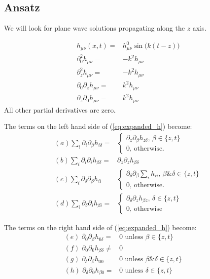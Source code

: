 \documentclass[]{article}
\begin{document}
\subsection{Ansatz}

We will look for plane wave solutions propagating along the $z$ axis.

\begin{align*}
	h_{\mu\nu}(x,t)=&h^0_{\mu\nu} \sin\big(k(t-z)\big)\\
	\partial_0^2 h_{\mu\nu}=& -k^2 h_{\mu\nu}\\
	\partial_z^2 h_{\mu\nu}=& -k^2 h_{\mu\nu}\\
	\partial_0 \partial_z  h_{\mu\nu}=& k^2 h_{\mu\nu}\\
	\partial_z \partial_0  h_{\mu\nu}=& k^2 h_{\mu\nu}
\end{align*}
All other partial derivatives are zero.

The terms on the left hand side of (\ref{eq:expanded_h}) become:
\begin{align*}
	(a)	\sum_i \partial_i\partial_\beta h_{i\delta} =& \begin{cases}
			\partial_z\partial_\beta h_{z\delta} \text{, $\beta\in \{z,t\}$}\\
			0 \text{, otherwise.}
		\end{cases}\\
	(b)	\sum_i \partial_i\partial_i h_{\beta\delta} =& \partial_z\partial_z h_{\beta\delta}\\
	(c)	\sum_i \partial_\delta \partial_\beta h_{ii} =&\begin{cases}
	\partial_\delta \partial_\beta \sum_i h_{ii} \text{, $\beta\&\delta\in\{z,t\}$}\\
	0 \text{, otherwise}.
	\end{cases}\\
	(d)	\sum_i \partial_\delta\partial_i h_{\beta i} =& \begin{cases}
	\partial_\delta\partial_z h_{\beta z} \text {, $\delta\in\{z,t\}$}\\
	0 \text{, otherwise }
	\end{cases}
\end{align*}

The terms on the right hand side of (\ref{eq:expanded_h}) become:
\begin{align*}
	(e)\;	\partial_0\partial_\beta h_{0\delta}=&0 \text{ unless $\beta\in\{z,t\}$ }\\
	(f)\;	\partial_0\partial_0 h_{\beta\delta}\ne&0\\
	(g)\;	\partial_\delta\partial_\beta h_{00}=&0 \text{ unless $\beta\&\delta\in\{z,t\}$ }\\
	(h)\;	\partial_\delta\partial_0 h_{\beta 0}=&0\text{ unless $\delta\in\{z,t\}$ }&
\end{align*}
\end{document}

